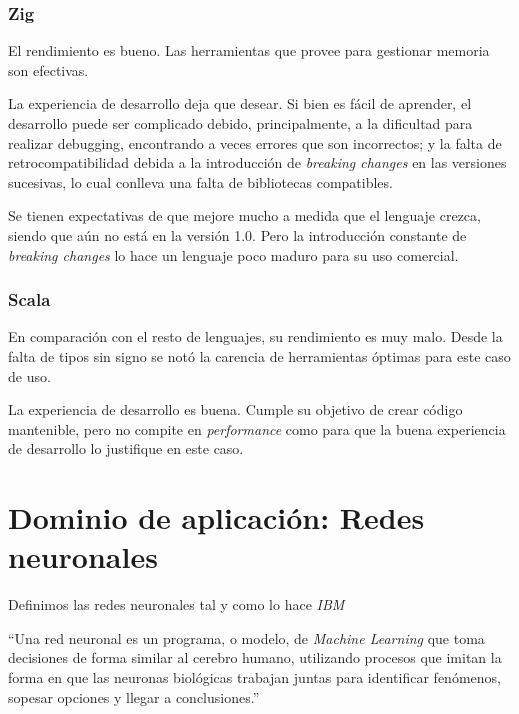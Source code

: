 \documentclass[11pt]{article}
\let\Oldsection\section
\renewcommand{\section}{\FloatBarrier\Oldsection}
\let\Oldsubsubsection\subsubsection
\renewcommand{\subsubsection}{\FloatBarrier\Oldsubsubsection}
\newcommand{\english}[1]{\textit{#1}}
\begin{document}
\subsubsection{Zig}

El rendimiento es bueno. Las herramientas que provee para gestionar memoria son efectivas.

La experiencia de desarrollo deja que desear. Si bien es fácil de aprender, el desarrollo puede ser complicado debido, principalmente, a la dificultad para realizar debugging, encontrando a veces errores que son incorrectos; y la falta de retrocompatibilidad debida a la introducción de \english{breaking changes} en las versiones sucesivas, lo cual conlleva una falta de bibliotecas compatibles. 

Se tienen expectativas de que mejore mucho a medida que el lenguaje crezca, siendo que aún no está en la versión 1.0. Pero la introducción constante de \english{breaking changes} lo hace un lenguaje poco maduro para su uso comercial.

\subsubsection{Scala}

En comparación con el resto de lenguajes, su rendimiento es muy malo. Desde la falta de tipos sin signo se notó la carencia de herramientas óptimas para este caso de uso.

La experiencia de desarrollo es buena. Cumple su objetivo de crear código mantenible, pero no compite en \english{performance} como para que la buena experiencia de desarrollo lo justifique en este caso.

\newpage

\section{Dominio de aplicación: Redes neuronales}

Definimos las redes neuronales tal y como lo hace \english{IBM} \cite{nn:definition}

\begin{displayquote}
``Una red neuronal es un programa, o modelo, de \english{Machine Learning} que toma decisiones de forma similar al cerebro humano, utilizando procesos que imitan la forma en que las neuronas biológicas trabajan juntas para identificar fenómenos, sopesar opciones y llegar a conclusiones.''
\end{displayquote}
\end{document}
